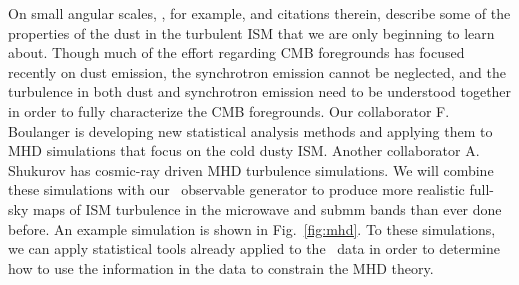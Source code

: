 

On small angular scales, \citet{pipLIV}, for example, and citations therein, describe some of the properties of the dust in the turbulent ISM that we are only beginning to learn about. 
Though much of the effort regarding CMB foregrounds has focused recently on dust emission, the synchrotron emission cannot be neglected, and the turbulence in both dust and synchrotron emission need to be understood together in order to fully characterize the CMB foregrounds.  Our collaborator F. Boulanger is developing new statistical analysis methods and applying them to MHD simulations that focus on the cold dusty ISM.  Another collaborator A. Shukurov has cosmic-ray driven MHD turbulence simulations. We will combine these simulations with our \hammurabi\ observable generator \citep{waelkens:2009} to produce more realistic full-sky maps of ISM turbulence in the microwave and submm bands than ever done before. An example simulation is shown in Fig.~\ref{fig:mhd}. To these simulations, we can apply statistical tools already applied to the \planck\ data in order to determine how to use the information in the data to constrain the MHD theory. 


